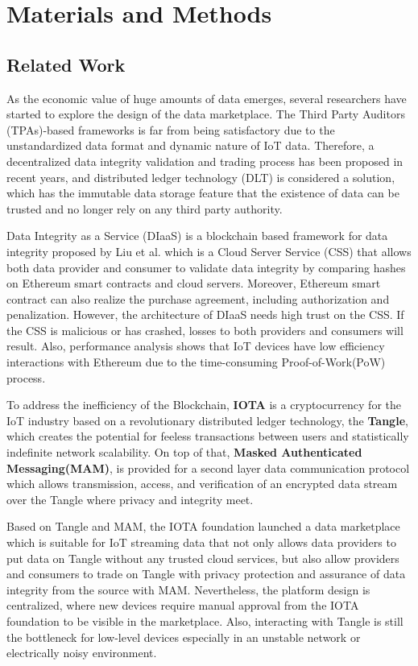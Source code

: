 \documentclass[journal,article,submit,moreauthors,pdftex]{Definitions/mdpi}
\begin{document}
\section{Materials and Methods}
\subsection{Related Work}
As the economic value of huge amounts of data emerges, several researchers have started to explore the design of the data marketplace. The Third Party Auditors (TPAs)-based frameworks\cite{TPA} is far from being satisfactory due to the unstandardized data format and dynamic nature of IoT data. Therefore, a decentralized data integrity validation and trading process has been proposed in recent years, and distributed ledger technology (DLT) is considered a solution, which has the immutable data storage feature that the existence of data can be trusted and no longer rely on any third party authority.

Data Integrity as a Service (DIaaS) is a blockchain based framework for data integrity proposed by Liu et al.\cite{DIaas} which is a Cloud Server Service (CSS) that allows both data provider and consumer to validate data integrity by comparing hashes on Ethereum smart contracts\cite{smartContract} and cloud servers. Moreover, Ethereum smart contract can also realize the purchase agreement, including authorization and penalization. However, the architecture of DIaaS needs high trust on the CSS. If the CSS is malicious or has crashed, losses to both providers and consumers will result. Also, performance analysis shows that IoT devices have low efficiency interactions with Ethereum due to the time-consuming Proof-of-Work(PoW) process.

To address the inefficiency of the Blockchain, \textbf{IOTA}\cite{IOTAwhitepaper} is a cryptocurrency for the IoT industry based on a revolutionary distributed ledger technology, the \textbf{Tangle}, which creates the potential for feeless transactions between users and statistically indefinite network scalability. On top of that, \textbf{Masked Authenticated Messaging(MAM)}\cite{MAM}, is provided for a second layer data communication protocol which allows transmission, access, and verification of an encrypted data stream over the Tangle where privacy and integrity meet.

Based on Tangle and MAM, the IOTA foundation launched a data marketplace\cite{IOTADataMarket} which is suitable for IoT streaming data that not only allows data providers to put data on Tangle without any trusted cloud services, but also allow providers and consumers to trade on Tangle with privacy protection and assurance of data integrity from the source with MAM. Nevertheless, the platform design is centralized, where new devices require manual approval from the IOTA foundation to be visible in the marketplace. Also, interacting with Tangle is still the bottleneck for low-level devices especially in an unstable network or electrically noisy environment.
\end{document}
